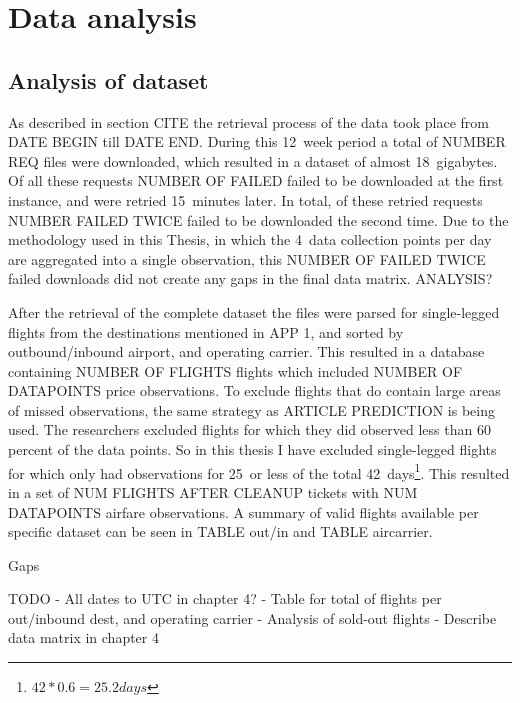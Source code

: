 \chapter{Data analysis}
\label{chap:DataAnalysis}
\section{Analysis of dataset}
As described in section {CITE} the retrieval process of the data took place from {DATE BEGIN} till {DATE END}. During this 12~week period a total of {NUMBER REQ} files were downloaded, which resulted in a dataset of almost 18~gigabytes. Of all these requests {NUMBER OF FAILED} failed to be downloaded at the first instance, and were retried 15~minutes later. In total, of these retried requests {NUMBER FAILED TWICE} failed to be downloaded the second time. Due to the methodology used in this Thesis, in which the 4~data collection points per day are aggregated into a single observation, this {NUMBER OF FAILED TWICE} failed downloads did not create any gaps in the final data matrix. {ANALYSIS?}

After the retrieval of the complete dataset the files were parsed for single-legged flights from the destinations mentioned in {APP 1}, and sorted by outbound/inbound airport, and operating carrier. This resulted in a database containing {NUMBER OF FLIGHTS} flights which included {NUMBER OF DATAPOINTS} price observations. To exclude flights that do contain large areas of missed observations, the same strategy as {ARTICLE PREDICTION} is being used. The researchers excluded flights for which they did observed less than 60 percent of the data points. So in this thesis I have excluded single-legged flights for which only had observations for 25~or less of the total 42~days\footnote{$42*0.6=25.2 days$}. This resulted in a set of {NUM FLIGHTS AFTER CLEANUP} tickets with {NUM DATAPOINTS} airfare observations. A summary of valid flights available per specific dataset can be seen in {TABLE out/in} and {TABLE aircarrier}.

Gaps


TODO
- All dates to UTC {in chapter 4?}
- Table for total of flights per out/inbound dest, and operating carrier
- Analysis of sold-out flights
- Describe data matrix {in chapter 4}
